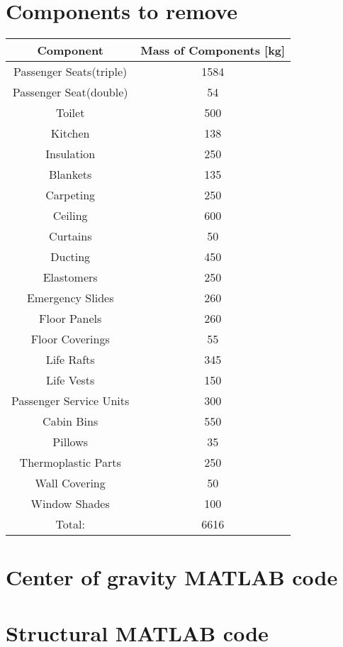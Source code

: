 \chapter{Components to remove}\label{appendix:to_remove_table}
\begin{table}[]
\begin{tabular}{|c|c|}
\hline
Component               & Mass of Components {[}kg{]} \\
\hline
Passenger Seats(triple) & 1584                        \\
Passenger Seat(double)  & 54                          \\
Toilet                  & 500                         \\
Kitchen                 & 138                         \\
Insulation              & 250                         \\
Blankets                & 135                         \\
Carpeting               & 250                         \\
Ceiling                 & 600                         \\
Curtains                & 50                          \\
Ducting                 & 450                         \\
Elastomers              & 250                         \\
Emergency Slides        & 260                         \\
Floor Panels            & 260                         \\
Floor Coverings         & 55                          \\
Life Rafts              & 345                         \\
Life Vests              & 150                         \\
Passenger Service Units & 300                         \\
Cabin Bins              & 550                         \\
Pillows                 & 35                          \\
Thermoplastic Parts     & 250                         \\
Wall Covering           & 50                          \\
Window Shades           & 100                         \\
\hline
Total:                  & 6616                        \\
\hline
\end{tabular}
\end{table}

\chapter{Center of gravity MATLAB code}\label{appendix:cg_code}


\chapter{Structural MATLAB code}\label{appendix:structural_code}

